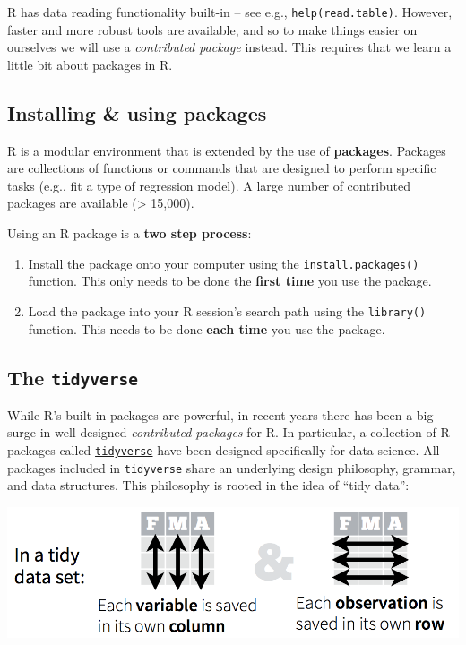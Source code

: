 \documentclass[]{book}
\begin{document}
R has data reading functionality built-in -- see e.g.,
\texttt{help(read.table)}. However, faster and more robust tools are
available, and so to make things easier on ourselves we will use a
\emph{contributed package} instead. This requires that we
learn a little bit about packages in R.

\hypertarget{installing-using-packages}{%
\subsection{Installing \& using packages}\label{installing-using-packages}}

R is a modular environment that is extended by the use of \textbf{packages}.
Packages are collections of functions or commands that are designed to
perform specific tasks (e.g., fit a type of regression model). A large
number of contributed packages are available (\textgreater{} 15,000).

Using an R package is a \textbf{two step process}:

\begin{enumerate}
\def\labelenumi{\arabic{enumi}.}
\item
  Install the package onto your computer using the
  \texttt{install.packages()} function. This only needs to
  be done the \textbf{first time} you use the package.
\item
  Load the package into your R session's search path
  using the \texttt{library()} function. This needs to be done
  \textbf{each time} you use the package.
\end{enumerate}

\hypertarget{the-tidyverse}{%
\subsection{\texorpdfstring{The \texttt{tidyverse}}{The tidyverse}}\label{the-tidyverse}}

While R's built-in packages are powerful, in recent years there has
been a big surge in well-designed \emph{contributed packages} for R. In
particular, a collection of R packages called
\href{https://www.tidyverse.org/}{\texttt{tidyverse}} have been
designed specifically for data science. All packages included in
\texttt{tidyverse} share an underlying design philosophy, grammar, and
data structures. This philosophy is rooted in the idea of ``tidy data'':

\includegraphics{R/Rintro/images/tidy_data.png}
\end{document}
